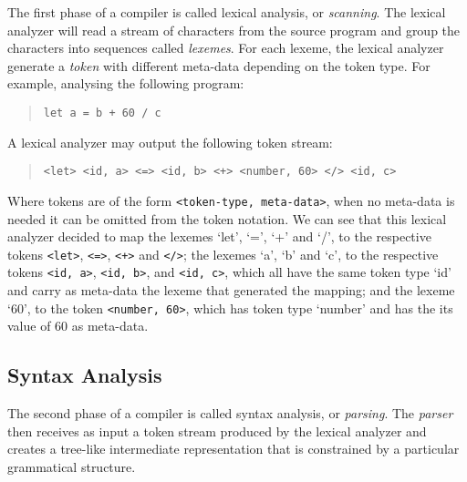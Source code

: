 \documentclass[english, lmodern, oneside, embeddedlogo]{ufsc-thesis-rn46-2019}
\begin{document}
The first phase of a compiler is called lexical analysis, or \textit{scanning}.
The lexical analyzer will read a stream of characters from the source program and group the characters into sequences called \textit{lexemes}.
For each lexeme, the lexical analyzer generate a \textit{token} with different meta-data depending on the token type.
For example, analysing the following program:
\begin{quote}
    \begin{verbatim}
let a = b + 60 / c
\end{verbatim}
\end{quote}
A lexical analyzer may output the following token stream:
\begin{quote}\label{figure:introduction_token_stream}
    \begin{verbatim}
<let> <id, a> <=> <id, b> <+> <number, 60> </> <id, c>
\end{verbatim}
\end{quote}
Where tokens are of the form \verb+<token-type, meta-data>+, when no meta-data is needed it can be omitted from the token notation.
We can see that this lexical analyzer decided to map the lexemes `let', `=', `+' and `/', to the respective tokens \verb+<let>+, \verb+<=>+, \verb-<+>- and \verb+</>+;
the lexemes `a', `b' and `c', to the respective tokens \verb+<id, a>+, \verb+<id, b>+, and \verb+<id, c>+, which all have the same token type `id' and carry as meta-data the lexeme that generated the mapping; and the lexeme `60', to the token \verb+<number, 60>+, which has token type `number' and has the its value of $60$ as meta-data.
\subsection{Syntax Analysis}

The second phase of a compiler is called syntax analysis, or \textit{parsing}.
The \textit{parser} then receives as input a token stream produced by the lexical analyzer and creates a tree-like intermediate representation that is constrained by a particular grammatical structure.

\end{document}

